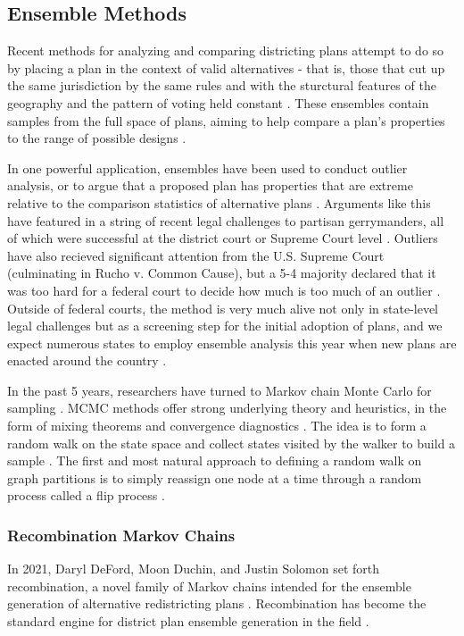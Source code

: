 \documentclass[sn-vancouver,Numbered]{sn-jnl}
\theoremstyle{thmstyleone}%
\theoremstyle{thmstyletwo}%
\theoremstyle{thmstylethree}%
\begin{document}
\subsection{Ensemble Methods}
Recent methods for analyzing and comparing districting plans attempt to do so by placing a plan in the context of valid alternatives - that is, those that cut up the same jurisdiction by the same rules and with the sturctural features of the geography and the pattern of voting held constant \cite{deford2021recombination}. These ensembles contain samples from the full space of plans, aiming to help compare a plan's properties to the range of possible designs \cite{deford2021recombination}. 

In one powerful application, ensembles have been used to conduct outlier analysis, or to argue that a proposed plan has properties that are extreme relative to the comparison statistics of alternative plans \cite{deford2021recombination}. Arguments like this have featured in a string of recent legal challenges to partisan gerrymanders, all of which were successful at the district court or Supreme Court level \cite{deford2021recombination}. Outliers have also recieved significant attention from the U.S. Supreme Court (culminating in Rucho v. Common Cause), but a 5-4 majority declared that it was too hard for a federal court to decide how much is too much of an outlier \cite{deford2021recombination}. Outside of federal courts, the method is very much alive not only in state-level legal challenges but as a screening step for the initial adoption of plans, and we expect numerous states to employ ensemble analysis this year when new plans are enacted around the country \cite{deford2021recombination}.

In the past 5 years, researchers have turned to Markov chain Monte Carlo for sampling \cite{deford2021recombination}. MCMC methods offer strong underlying theory and heuristics, in the form of mixing theorems and convergence diagnostics \cite{deford2021recombination}. The idea is to form a random walk on the state space and collect states visited by the walker to build a sample \cite{deford2021recombination}. The first and most natural approach to defining a random walk on graph partitions is to simply reassign one node at a time through a random process called a flip process \cite{deford2021recombintion}. 

\subsubsection{Recombination Markov Chains}
In 2021, Daryl DeFord, Moon Duchin, and Justin Solomon set forth recombination, a novel family of Markov chains intended for the ensemble generation of alternative redistricting plans \cite{deford2021recombination}. Recombination has become the standard engine for district plan ensemble generation in the field \cite{BeckerDuchinGoldHirsch2021}.
\end{document}
